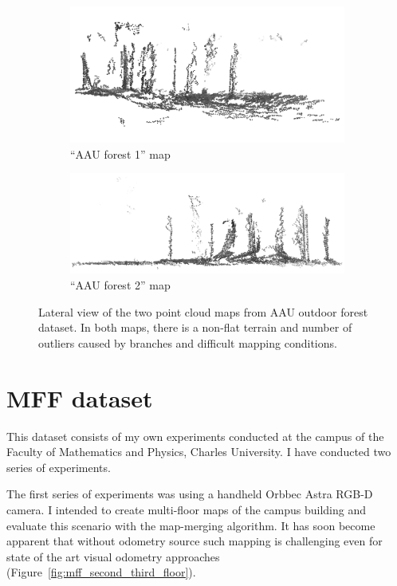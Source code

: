 \begin{figure}
    \centering
    \begin{subfigure}[b]{\textwidth}
        \includegraphics[width=\textwidth]{../img/aau_fc_dnav5_lateral.png}
        \caption{``\gls{AAU} forest 1'' map}
    \end{subfigure}
    \begin{subfigure}[b]{\textwidth}
        \includegraphics[width=\textwidth]{../img/aau_fc_dnav6_lateral.png}
        \caption{``\gls{AAU} forest 2'' map}
    \end{subfigure}
    \caption[Forest point cloud maps -- lateral view]{Lateral view of the two point cloud maps from \gls{AAU} outdoor forest dataset. In both maps, there is a non-flat terrain and number of outliers caused by branches and difficult mapping conditions.}
    \label{fig:aau_lateral}
\end{figure}

\section{MFF dataset}
\label{sec:mff-dataset}

This dataset consists of my own experiments conducted at the campus of the Faculty of Mathematics and Physics, Charles University. I have conducted two series of experiments.

The first series of experiments was using a handheld Orbbec Astra \gls{RGB-D} camera. I intended to create multi-floor maps of the campus building and evaluate this scenario with the map-merging algorithm. It has soon become apparent that without odometry source such mapping is challenging even for state of the art visual odometry approaches (Figure~\ref{fig:mff_second_third_floor}).

